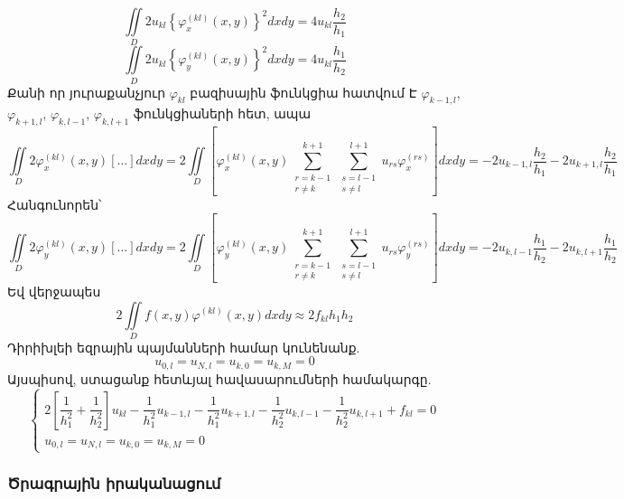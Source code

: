\documentclass[fleqn, bachelor,subf,12pt,notitlepage]{article}
\begin{document}
\begin{equation}
\iint \limits_{D} 2u_{kl}\left\{\varphi_{x}^{(kl)}(x,y)\right\}^{2}dxdy = 4u_{kl}\dfrac{h_{2}}{h_{1}}
\end{equation}
\begin{equation}
\iint \limits_{D} 2u_{kl}\left\{\varphi_{y}^{(kl)}(x,y)\right\}^{2}dxdy = 4u_{kl}\dfrac{h_{1}}{h_{2}}
\end{equation}
Քանի որ յուրաքանչյուր $\varphi_{kl}$ բազիսային ֆունկցիա հատվում Է $\varphi_{k-1, l}$, $\varphi_{k+1, l}$, $\varphi_{k, l-1}$, $\varphi_{k, l+1}$ ֆունկցիաների հետ, ապա
\begin{equation}
\iint \limits_{D} 2\varphi_{x}^{(kl)}(x,y)[\dots]dxdy = 2\iint \limits_{D}\left[\varphi_{x}^{(kl)}(x,y)\sum_{\substack{r=k-1\\ r \neq k}}^{k+1} \sum_{\substack{s=l-1\\ s \neq l}}^{l+1} u_{rs} \varphi_{x}^{(rs)}\right]dxdy= -2u_{k-1, l}\dfrac{h_{2} }{h_{1}} -2u_{k+1, l}\dfrac{ h_{2}}{h_{1}}
\end{equation}
Հանգունորեն՝
\begin{equation}
\iint \limits_{D} 2\varphi_{y}^{(kl)}(x,y)[\dots]dxdy = 2\iint \limits_{D}\left[\varphi_{y}^{(kl)}(x,y)\sum_{\substack{r=k-1\\ r \neq k}}^{k+1} \sum_{\substack{s=l-1\\ s \neq l}}^{l+1} u_{rs} \varphi_{y}^{(rs)}\right]dxdy=-2u_{k, l-1}\dfrac{h_{1}} {h_{2}} - 2u_{k, l+1}\dfrac{h_{1}}{ h_{2}}
\end{equation}
Եվ վերջապես
\begin{equation}
2\iint \limits_{D} f(x,y)\varphi^{(kl)}(x,y)dxdy \approx 2 f_{kl} h_{1} h_{2}
\end{equation}
Դիրիխլեի եզրային պայմանների համար կունենանք.
$$u_{0, l} = u_{N, l} = u_{k, 0} = u_{k, M} = 0$$
Այսպիսով, ստացանք հետևյալ հավասարումների համակարգը.
\begin{equation}
\begin{cases}
			2\left[\dfrac{1}{h^{2}_{1}} + \dfrac{1}{h^{2}_{2}}\right] u_{kl}  -\dfrac{1}{h^{2}_{1}}u_{k-1, l} - \dfrac{1}{h^{2}_{1}}u_{k+1, l} -\dfrac{1}{h^{2}_{2}}u_{k, l-1} - \dfrac{1}{h^{2}_{2}}u_{k, l+1} + f_{kl} = 0\\
			u_{0, l} = u_{N, l} = u_{k, 0} = u_{k, M} = 0
\end{cases}
\end{equation}
\newpage
\subsubsection*{{Ծրագրային իրականացում}}
\end{document}

